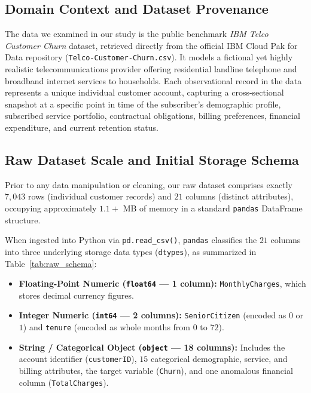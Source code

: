 \subsection{Domain Context and Dataset Provenance}
The data we examined in our study is the public benchmark \textit{IBM Telco Customer Churn} dataset, retrieved directly from the official IBM Cloud Pak for Data repository (\texttt{Telco-Customer-Churn.csv}). It models a fictional yet highly realistic telecommunications provider offering residential landline telephone and broadband internet services to households. Each observational record in the data represents a unique individual customer account, capturing a cross-sectional snapshot at a specific point in time of the subscriber's demographic profile, subscribed service portfolio, contractual obligations, billing preferences, financial expenditure, and current retention status.

\subsection{Raw Dataset Scale and Initial Storage Schema}
Prior to any data manipulation or cleaning, our raw dataset comprises exactly $7,043$ rows (individual customer records) and $21$ columns (distinct attributes), occupying approximately $1.1+$ MB of memory in a standard \texttt{pandas} DataFrame structure. 

When ingested into Python via \texttt{pd.read\_csv()}, \texttt{pandas} classifies the $21$ columns into three underlying storage data types (\texttt{dtypes}), as summarized in Table~\ref{tab:raw_schema}:
\begin{itemize}
    \item \textbf{Floating-Point Numeric (\texttt{float64} --- 1 column):} \texttt{MonthlyCharges}, which stores decimal currency figures.
    \item \textbf{Integer Numeric (\texttt{int64} --- 2 columns):} \texttt{SeniorCitizen} (encoded as $0$ or $1$) and \texttt{tenure} (encoded as whole months from $0$ to $72$).
    \item \textbf{String / Categorical Object (\texttt{object} --- 18 columns):} Includes the account identifier (\texttt{customerID}), $15$ categorical demographic, service, and billing attributes, the target variable (\texttt{Churn}), and one anomalous financial column (\texttt{TotalCharges}).
\end{itemize}

